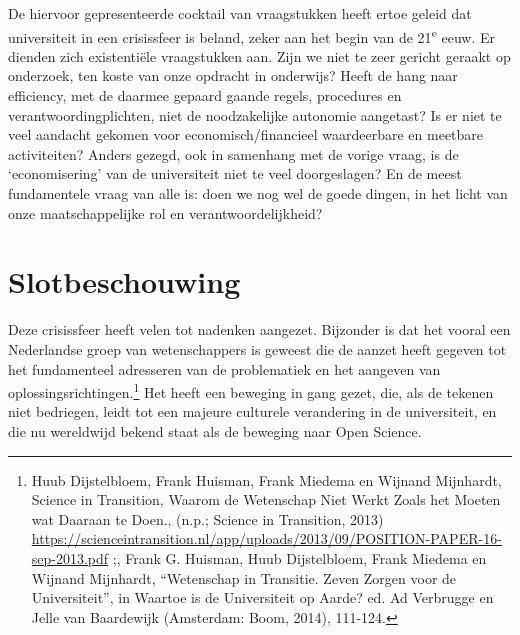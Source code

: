 \documentclass[empirical, authordate, ]{new-jote-article}
\begin{document}
	De hiervoor gepresenteerde cocktail van vraagstukken heeft ertoe geleid dat universiteit in een crisissfeer is beland, zeker aan het begin van de 21\textsuperscript{e} eeuw. Er dienden zich existentiële vraagstukken aan. Zijn we niet te zeer gericht geraakt op onderzoek, ten koste van onze opdracht in onderwijs? Heeft de hang naar efficiency, met de daarmee gepaard gaande regels, procedures en verantwoordingplichten, niet de noodzakelijke autonomie aangetast? Is er niet te veel aandacht gekomen voor economisch/financieel waardeerbare en meetbare activiteiten? Anders gezegd, ook in samenhang met de vorige vraag, is de ‘economisering' van de universiteit niet te veel doorgeslagen? En de meest fundamentele vraag van alle is: doen we nog wel de goede dingen, in het licht van onze maatschappelijke rol en verantwoordelijkheid?



	\section{Slotbeschouwing }



	Deze crisissfeer heeft velen tot nadenken aangezet. Bijzonder is dat het vooral een Nederlandse groep van wetenschappers is geweest die de aanzet heeft gegeven tot het fundamenteel adresseren van de problematiek en het aangeven van oplossingsrichtingen.\footnote{Huub Dijstelbloem, Frank Huisman, Frank Miedema en Wijnand Mijnhardt, Science in Transition, Waarom de Wetenschap Niet Werkt Zoals het Moeten wat Daaraan te Doen., (n.p.; Science in Transition, 2013) \href{https://scienceintransition.nl/app/uploads/2013/09/POSITION-PAPER-16-sep-2013.pdf}{https://scienceintransition.nl/app/uploads/2013/09/POSITION-PAPER-16-sep-2013.pdf} ;, Frank G. Huisman, Huub Dijstelbloem, Frank Miedema en Wijnand Mijnhardt, “Wetenschap in Transitie. Zeven Zorgen voor de Universiteit”, in Waartoe is de Universiteit op Aarde? ed. Ad Verbrugge en Jelle van Baardewijk (Amsterdam: Boom, 2014), 111-124.} Het heeft een beweging in gang gezet, die, als de tekenen niet bedriegen, leidt tot een majeure culturele verandering in de universiteit, en die nu wereldwijd bekend staat als de beweging naar Open Science.
\end{document}
